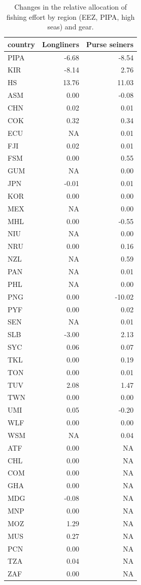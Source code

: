 \documentclass[12pt,]{article}
\begin{document}
\begin{table}[H]

\caption{\label{tab:unnamed-chunk-8}\label{tab:ba_disp}Changes in the relative allocation of fishing effort by region (EEZ, PIPA, high seas) and gear.}
\centering
\begin{tabular}[t]{lrr}
\toprule
country & Longliners & Purse seiners\\
\midrule
PIPA & -6.68 & -8.54\\
KIR & -8.14 & 2.76\\
HS & 13.76 & 11.03\\
ASM & 0.00 & -0.08\\
CHN & 0.02 & 0.01\\
\addlinespace
COK & 0.32 & 0.34\\
ECU & NA & 0.01\\
FJI & 0.02 & 0.01\\
FSM & 0.00 & 0.55\\
GUM & NA & 0.00\\
\addlinespace
JPN & -0.01 & 0.01\\
KOR & 0.00 & 0.00\\
MEX & NA & 0.00\\
MHL & 0.00 & -0.55\\
NIU & NA & 0.00\\
\addlinespace
NRU & 0.00 & 0.16\\
NZL & NA & 0.59\\
PAN & NA & 0.01\\
PHL & NA & 0.00\\
PNG & 0.00 & -10.02\\
\addlinespace
PYF & 0.00 & 0.02\\
SEN & NA & 0.01\\
SLB & -3.00 & 2.13\\
SYC & 0.06 & 0.07\\
TKL & 0.00 & 0.19\\
\addlinespace
TON & 0.00 & 0.01\\
TUV & 2.08 & 1.47\\
TWN & 0.00 & 0.00\\
UMI & 0.05 & -0.20\\
WLF & 0.00 & 0.00\\
\addlinespace
WSM & NA & 0.04\\
ATF & 0.00 & NA\\
CHL & 0.00 & NA\\
COM & 0.00 & NA\\
GHA & 0.00 & NA\\
\addlinespace
MDG & -0.08 & NA\\
MNP & 0.00 & NA\\
MOZ & 1.29 & NA\\
MUS & 0.27 & NA\\
PCN & 0.00 & NA\\
\addlinespace
TZA & 0.04 & NA\\
ZAF & 0.00 & NA\\
\bottomrule
\end{tabular}
\end{table}
\end{document}
